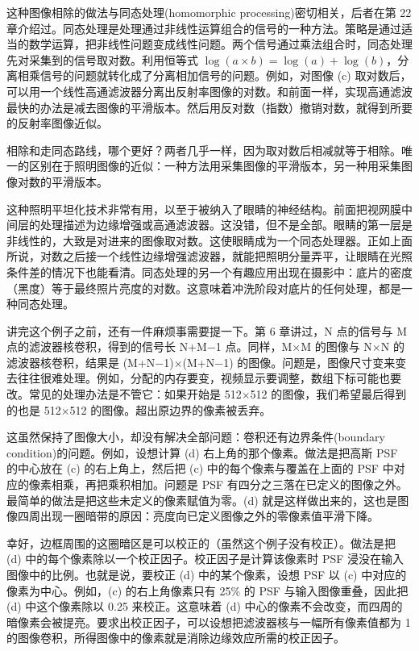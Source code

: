 这种图像相除的做法与同态处理(homomorphic processing)密切相关，后者在第
22
章介绍过。同态处理是处理通过非线性运算组合的信号的一种方法。策略是通过适当的数学运算，把非线性问题变成线性问题。两个信号通过乘法组合时，同态处理先对采集到的信号取对数。利用恒等式
\(\log(a \times b) = \log(a) + \log(b)\)，分离相乘信号的问题就转化成了分离相加信号的问题。例如，对图像
(c)
取对数后，可以用一个线性高通滤波器分离出反射率图像的对数。和前面一样，实现高通滤波最快的办法是减去图像的平滑版本。然后用反对数（指数）撤销对数，就得到所要的反射率图像近似。

相除和走同态路线，哪个更好？两者几乎一样，因为取对数后相减就等于相除。唯一的区别在于照明图像的近似：一种方法用采集图像的平滑版本，另一种用采集图像对数的平滑版本。

这种照明平坦化技术非常有用，以至于被纳入了眼睛的神经结构。前面把视网膜中间层的处理描述为边缘增强或高通滤波器。这没错，但不是全部。眼睛的第一层是非线性的，大致是对进来的图像取对数。这使眼睛成为一个同态处理器。正如上面所说，对数之后接一个线性边缘增强滤波器，就能把照明分量弄平，让眼睛在光照条件差的情况下也能看清。同态处理的另一个有趣应用出现在摄影中：底片的密度（黑度）等于最终照片亮度的对数。这意味着冲洗阶段对底片的任何处理，都是一种同态处理。

讲完这个例子之前，还有一件麻烦事需要提一下。第 6 章讲过，N 点的信号与 M
点的滤波器核卷积，得到的信号长 N+M−1 点。同样，M×M 的图像与 N×N
的滤波器核卷积，结果是 (M+N−1)×(M+N−1)
的图像。问题是，图像尺寸变来变去往往很难处理。例如，分配的内存要变，视频显示要调整，数组下标可能也要改。常见的处理办法是不管它：如果开始是
512×512 的图像，我们希望最后得到的也是 512×512
的图像。超出原边界的像素被丢弃。

这虽然保持了图像大小，却没有解决全部问题：卷积还有边界条件(boundary
condition)的问题。例如，设想计算 (d) 右上角的那个像素。做法是把高斯 PSF
的中心放在 (c) 的右上角上，然后把 (c) 中的每个像素与覆盖在上面的 PSF
中对应的像素相乘，再把乘积相加。问题是 PSF
有四分之三落在已定义的图像之外。最简单的做法是把这些未定义的像素赋值为零。(d)
就是这样做出来的，这也是图像四周出现一圈暗带的原因：亮度向已定义图像之外的零像素值平滑下降。

幸好，边框周围的这圈暗区是可以校正的（虽然这个例子没有校正）。做法是把
(d) 中的每个像素除以一个校正因子。校正因子是计算该像素时 PSF
浸没在输入图像中的比例。也就是说，要校正 (d) 中的某个像素，设想 PSF 以
(c) 中对应的像素为中心。例如，(c) 的右上角像素只有 25\% 的 PSF
与输入图像重叠，因此把 (d) 中这个像素除以 0.25 来校正。这意味着 (d)
中心的像素不会改变，而四周的暗像素会被提亮。要求出校正因子，可以设想把滤波器核与一幅所有像素值都为
1 的图像卷积，所得图像中的像素就是消除边缘效应所需的校正因子。

